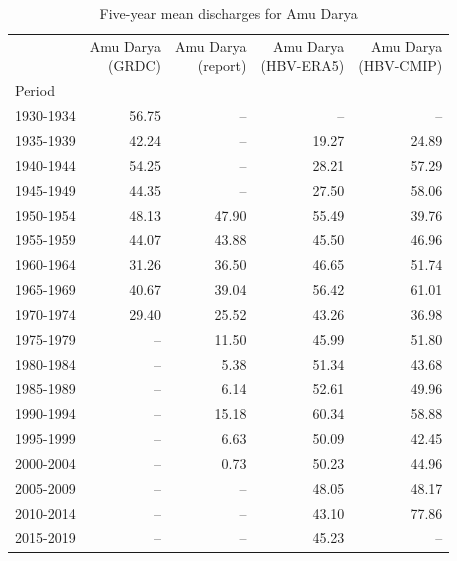 \begin{small}
\begin{table}
\caption{Five-year mean discharges for Amu Darya}
\label{tab:amu_darya_discharge}
\begin{tabular}{lrrrr}
\toprule
 & \makecell{Amu Darya\\(GRDC)} & \makecell{Amu Darya\\(report)} & \makecell{Amu Darya\\(HBV-ERA5)} & \makecell{Amu Darya\\(HBV-CMIP)} \\
Period &  &  &  &  \\
\midrule
1930-1934 & 56.75 & -- & -- & -- \\
1935-1939 & 42.24 & -- & 19.27 & 24.89 \\
1940-1944 & 54.25 & -- & 28.21 & 57.29 \\
1945-1949 & 44.35 & -- & 27.50 & 58.06 \\
1950-1954 & 48.13 & 47.90 & 55.49 & 39.76 \\
1955-1959 & 44.07 & 43.88 & 45.50 & 46.96 \\
1960-1964 & 31.26 & 36.50 & 46.65 & 51.74 \\
1965-1969 & 40.67 & 39.04 & 56.42 & 61.01 \\
1970-1974 & 29.40 & 25.52 & 43.26 & 36.98 \\
1975-1979 & -- & 11.50 & 45.99 & 51.80 \\
1980-1984 & -- & 5.38 & 51.34 & 43.68 \\
1985-1989 & -- & 6.14 & 52.61 & 49.96 \\
1990-1994 & -- & 15.18 & 60.34 & 58.88 \\
1995-1999 & -- & 6.63 & 50.09 & 42.45 \\
2000-2004 & -- & 0.73 & 50.23 & 44.96 \\
2005-2009 & -- & -- & 48.05 & 48.17 \\
2010-2014 & -- & -- & 43.10 & 77.86 \\
2015-2019 & -- & -- & 45.23 & -- \\
\bottomrule
\end{tabular}
\end{table}

\end{small}